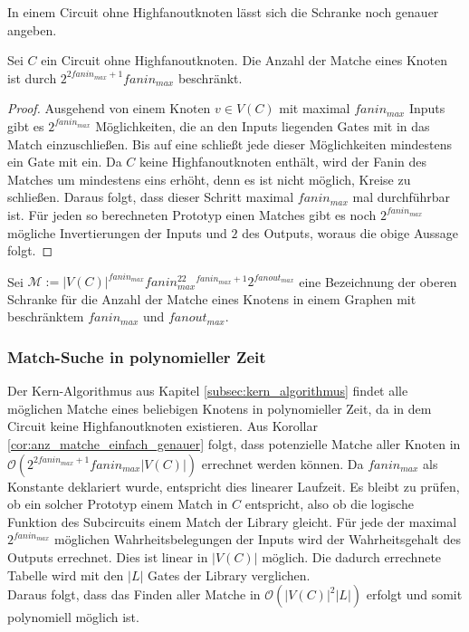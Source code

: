 \documentclass[11pt, a4paper, german]{article}
\begin{document}
In einem Circuit ohne Highfanoutknoten lässt sich die Schranke noch genauer angeben. 
\begin{cor}\label{cor:anz_matche_einfach_genauer}
Sei $C$ ein Circuit ohne Highfanoutknoten. Die Anzahl der Matche eines Knoten ist durch $2^{2fanin_{max} +1}fanin_{max}$ beschränkt.
\end{cor}
\begin{proof}
Ausgehend von einem Knoten $v \in V(C)$ mit maximal $fanin_{max}$ Inputs gibt es  $2^{fanin_{max}}$ Möglichkeiten, die an den Inputs liegenden Gates mit in das Match einzuschließen. Bis auf eine schließt jede dieser Möglichkeiten mindestens ein Gate mit ein. Da $C$ keine Highfanoutknoten enthält, wird der Fanin des Matches um mindestens eins erhöht, denn es ist nicht möglich, Kreise zu schließen. Daraus folgt, dass dieser Schritt maximal $fanin_{max}$ mal durchführbar ist. Für jeden so berechneten Prototyp einen Matches gibt es noch $2^{fanin_{max}}$ mögliche Invertierungen der Inputs und $2$ des Outputs, woraus die obige Aussage folgt.
\end{proof}
\begin{definition}
Sei $\mathcal{M}:= |V(C)|^{fanin_{max}} fanin_{max}^22^{fanin_{max}+1}2^{fanout_{max}}$ eine Bezeichnung der oberen Schranke für die Anzahl der Matche eines Knotens in einem Graphen mit beschränktem $fanin_{max}$ und $fanout_{max}$.
\end{definition}

\subsubsection{Match-Suche in polynomieller Zeit}
\label{subsubsec:pol_match_suche}
Der Kern-Algorithmus aus Kapitel \ref{subsec:kern_algorithmus} findet alle möglichen Matche eines beliebigen Knotens in polynomieller Zeit, da in dem Circuit keine Highfanoutknoten existieren. Aus Korollar \ref{cor:anz_matche_einfach_genauer} folgt, dass potenzielle Matche aller Knoten  in $\mathcal{O}(2^{2fanin_{max} +1}fanin_{max} |V(C)|)$ errechnet werden können. Da $fanin_{max}$ als Konstante deklariert wurde, entspricht dies linearer Laufzeit. Es bleibt zu prüfen, ob  ein solcher Prototyp einem Match in $C$ entspricht, also ob die logische Funktion des Subcircuits einem Match der Library gleicht. Für jede der maximal $2^{fanin_{max}}$ möglichen Wahrheitsbelegungen der Inputs wird der Wahrheitsgehalt des Outputs errechnet. Dies ist linear in $|V(C)|$ möglich. Die dadurch errechnete Tabelle wird mit den $|L|$ Gates der Library verglichen. \\
Daraus folgt, dass das Finden aller Matche in $\mathcal{O}(|V(C)|^2|L|)$ erfolgt und somit polynomiell möglich ist.
\end{document}
